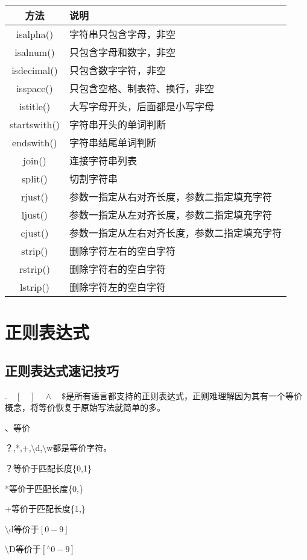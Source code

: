 \documentclass[twocolumn]{article}
\begin{document}
	\begin{tabular}{|c|p{}|}
		\hline
		方法 & 说明 \\
		\hline
		isalpha() & 字符串只包含字母，非空 \\
		\hline
		isalnum() & 只包含字母和数字，非空 \\
		\hline
	    isdecimal() & 只包含数字字符，非空 \\
		\hline
		isspace() & 只包含空格、制表符、换行，非空\\
		\hline
		istitle() & 大写字母开头，后面都是小写字母 \\
		\hline
		startswith() & 字符串开头的单词判断\\
		\hline
		endswith()  & 字符串结尾单词判断 \\
		\hline
		join() & 连接字符串列表\\
		\hline
		split() & 切割字符串 \\
		\hline
		rjust() &参数一指定从右对齐长度，参数二指定填充字符 \\
		\hline
		ljust() &参数一指定从左对齐长度，参数二指定填充字符 \\
		\hline
		cjust() &参数一指定从左右对齐长度，参数二指定填充字符 \\
		\hline
		strip() & 删除字符左右的空白字符 \\
		\hline
		rstrip() & 删除字符右的空白字符 \\
		\hline
		lstrip() & 删除字符左的空白字符 \\
		\hline
	\end{tabular}
	\section{正则表达式}
	\subsection{正则表达式速记技巧}
	$. \quad [\quad] \quad \wedge \quad \$ $是所有语言都支持的正则表达式，正则难理解因为其有一个等价概念，将等价恢复于原始写法就简单的多。

	、等价

	？,*,+,$\setminus$d,$\setminus$w都是等价字符。	

	？等价于匹配长度\{0,1\} 
	
	*等价于匹配长度\{0,\}
	
	+等价于匹配长度\{1,\}
	
	$\setminus$d等价于$[0-9]$
	
	$\setminus$D等价于$[^\land0-9]$
	
\end{document}
